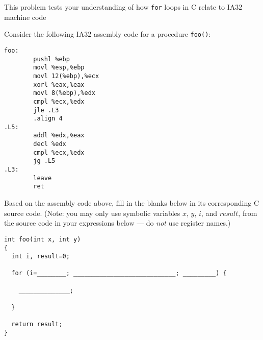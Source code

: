 \begin{problem}{8}
This problem tests your understanding of how {\tt for} loops in C relate
to IA32 machine code

Consider the following IA32 assembly code for a procedure {\tt foo()}:

\begin{verbatim}
foo:
        pushl %ebp
        movl %esp,%ebp
        movl 12(%ebp),%ecx
        xorl %eax,%eax
        movl 8(%ebp),%edx
        cmpl %ecx,%edx
        jle .L3
        .align 4
.L5:
        addl %edx,%eax
        decl %edx
        cmpl %ecx,%edx
        jg .L5
.L3:
        leave
        ret
\end{verbatim}

Based on the assembly code above, fill in the blanks below in its
corresponding C source code.  (Note: you may only use symbolic
variables $x$, $y$, $i$, and $result$, from the source code in your
expressions below --- do {\em not} use register names.)

\begin{verbatim}
int foo(int x, int y)
{
  int i, result=0;

  for (i=________; ____________________________; _________) {

    ______________;

  }

  return result;
}
\end{verbatim}
\end{problem}




